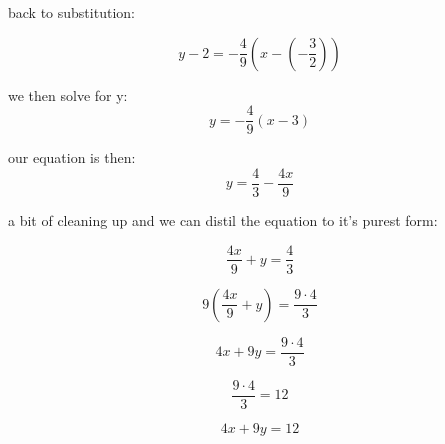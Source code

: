 back to substitution:

\begin{equation}
y -2 = -\frac{4}{9}\left ( x - \left ( -\frac{3}{2} \right ) \right )
\end{equation}

we then solve for y:
\begin{equation}
y = -\frac{4}{9}(x-3)
\end{equation}

our equation is then:
\begin{equation}
y = \frac{4}{3} - \frac{4x}{9}
\end{equation}

a bit of cleaning up and we can distil the equation to it's purest form:

\begin{equation}
  \frac{4x}{9} + y = \frac{4}{3}
\end{equation}


\begin{equation}
9\left ( \frac{4x}{9} + y \right ) = \frac{9 \cdot 4}{3}
\end{equation}

\begin{equation}
4x+9y=\frac{9\cdot 4}{3}
\end{equation}

\begin{equation}
\frac{9 \cdot 4}{3} = 12
\end{equation}

\begin{equation}
4x + 9y = 12
\end{equation}













\begin{comment}

Template for source code inclusion:

\begin{lstlisting}
import numpy as np

CPRN = 63952537
np.random.seed(CPRN)
np.set_printoptions(precision=3)

def generate_data():
    a = np.array([[1, 3, 1], [2, 1, 1], [-2, 2, -1]])
    x = np.linalg.det(a)
    y = np.linalg.inv(a)
    print(x)
    print(y)

d = np.random.randint(10000, 100000, 3)
generate_data()

print(d)
\end{lstlisting}
\end{comment}


